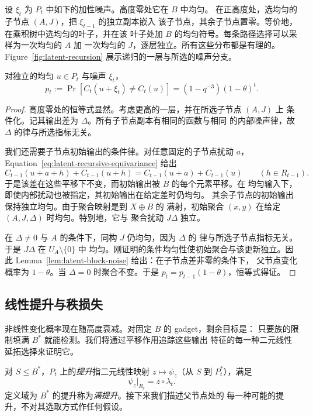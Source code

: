 设 $\xi_t$ 为 $P_t$ 中如下的加性噪声。高度零处它在 $B$ 中均匀。
在正高度处，选均匀的子节点 $(A,J)$，把 $\xi_{t-1}$ 的独立副本嵌入
该子节点，其余子节点置零。等价地，在乘积树中选均匀的叶子，并在该
叶子处加 $B$ 的均匀符号。每条路径选择可以采样为一次均匀的 $A$ 加
一次均匀的 $J$，逐层独立。所有这些分布都是有理的。
Figure~\ref{fig:latent-recursion} 展示递归的一层与所选的噪声分支。

\FloatBarrier

\begin{lemma}\label{lem:latent-noise}
对独立的均匀 $u\in P_t$ 与噪声 $\xi_t$，
\begin{equation}\label{eq:latent-change-probability}
 p_t:=\Pr[C_t(u+\xi_t)\ne C_t(u)]
     =(1-q^{-3})(1-\theta)^t.
\end{equation}
\end{lemma}

\begin{proof}
高度零处的恒等式显然。考虑更高的一层，并在所选子节点 $(A,J)$ 上
条件化。记其输出差为 $\Delta$。所有子节点副本有相同的函数与相同
的内部噪声律，故 $\Delta$ 的律与所选指标无关。

我们还需要子节点初始输出的条件律。对任意固定的子节点扰动 $a$，
Equation~\eqref{eq:latent-recursive-equivariance} 给出
\[
 C_{t-1}(u+a+h)+C_{t-1}(u+h)
 =C_{t-1}(u+a)+C_{t-1}(u)
 \qquad(h\in R_{t-1}).
\]
于是该差在这些平移下不变，而初始输出被 $B$ 的每个元素平移。在
均匀输入下，即使内部扰动也被指定，其初始输出在给定差时仍均匀。
其余子节点的初始输出保持独立均匀。由于聚合映射是到 $X\oplus B$ 的
满射，初始聚合 $(x,y)$ 在给定 $(A,J,\Delta)$ 时均匀。特别地，它与
聚合扰动 $J\Delta$ 独立。

在 $\Delta\ne0$ 与 $A$ 的条件下，同构 $J$ 仍均匀，因为 $\Delta$ 的
律与所选子节点指标无关。于是 $J\Delta$ 在 $U_A\setminus\{0\}$ 中
均匀。刚证明的条件均匀性使初始聚合与该更新独立。因此
Lemma~\ref{lem:latent-block-noise} 给出：在子节点差非零的条件下，
父节点变化概率为 $1-\theta$。当 $\Delta=0$ 时聚合不变。于是
$p_t=p_{t-1}(1-\theta)$，恒等式得证。
\end{proof}

\subsection{线性提升与秩损失}

非线性变化概率现在随高度衰减。对固定 $B$ 的 gadget，剩余目标是：
只要族的限制填满 $B^*$ 就能检测。我们将通过平移作用追踪这些输出
特征的每一种二元线性延拓选择来证明它。

对 $S\le B^*$，$P_t$ 上的\emph{提升}指二元线性映射
$z\mapsto\psi_z$（从 $S$ 到 $P_t^*$），满足
\begin{equation}\label{eq:latent-lift-definition}
 \psi_z|_{R_t}=z\circ\lambda_t.
\end{equation}
定义域为 $B^*$ 的提升称为\emph{满提升}。接下来我们描述父节点处的
每一种可能的提升，不对其选取方式作任何假设。

